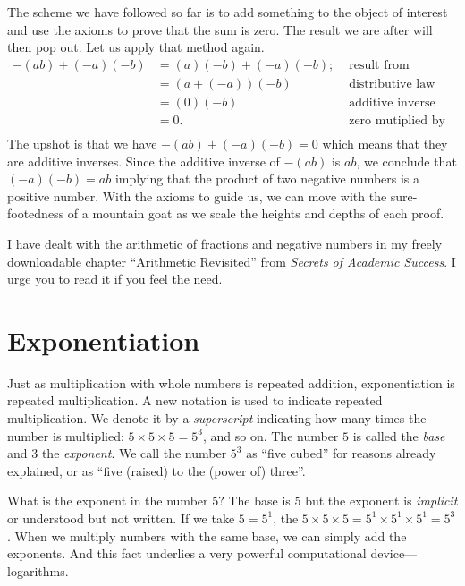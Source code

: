 \documentclass[
  a4paper,
]{article}
\begin{document}
The scheme we have followed so far is to add something to the object of
interest and use the axioms to prove that the sum is zero. The result we
are after will then pop out. Let us apply that method again. \[
\begin{aligned}
-(ab) + (-a)(-b) &= (a)(-b) + (-a)(-b); & \mbox{ result from previous section}\\
&= (a + (-a))(-b) & \mbox{ distributive law}\\
&= (0)(-b) & \mbox{ additive inverse}\\
&= 0. & \mbox{ zero mutiplied by anything is zero}\\
\end{aligned}
\] The upshot is that we have \(-(ab) + (-a)(-b) = 0\) which means that
they are additive inverses. Since the additive inverse of \(-(ab)\) is
\(ab\), we conclude that \((-a)(-b) = ab\) implying that the product of
two negative numbers is a positive number. With the axioms to guide us,
we can move with the sure-footedness of a mountain goat as we scale the
heights and depths of each proof.

I have dealt with the arithmetic of fractions and negative numbers in my
freely downloadable chapter ``Arithmetic Revisited'' from
\href{https://swanlotus.netlify.app/sas-manuscript/SAS-partial.pdf}{\emph{Secrets
of Academic Success}}. I urge you to read it if you feel the need.

\hypertarget{exponentiation}{%
\section{Exponentiation}\label{exponentiation}}

Just as multiplication with whole numbers is repeated addition,
exponentiation is repeated multiplication. A new notation is used to
indicate repeated multiplication. We denote it by a \emph{superscript}
indicating how many times the number is multiplied:
\(5 \times 5 \times 5 = 5^{3}\), and so on. The number \(5\) is called
the \emph{base} and \(3\) the \emph{exponent}. We call the number
\(5^{3}\) as ``five cubed'' for reasons already explained, or as ``five
(raised) to the (power of) three''.

What is the exponent in the number \(5?\) The base is \(5\) but the
exponent is \emph{implicit} or understood but not written. If we take
\(5 = 5^{1}\), the
\(5 \times 5 \times 5 = 5^{1} \times 5^{1} \times 5^{1} = 5^{3}\). When
we multiply numbers with the same base, we can simply add the exponents.
And this fact underlies a very powerful computational
device---logarithms.
\end{document}
